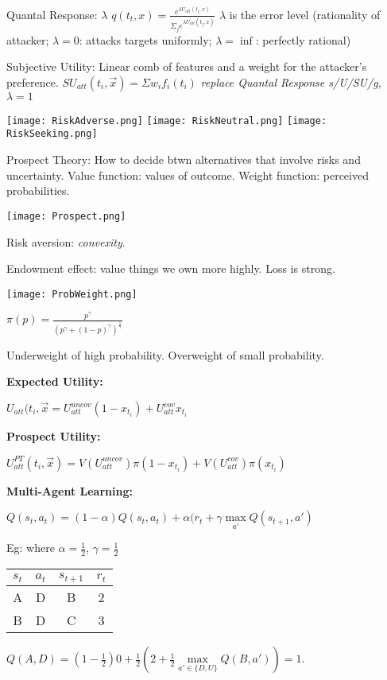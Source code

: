\documentclass[12pt,letter]{article}
\begin{document}
\begin{multicols}{2}
Quantal Response: $\lambda$
$q(t_t,x) = \frac{e^{\lambda U_{att}(t_i,x)}}{\Sigma_j e^{\lambda U_{att}(t_j,x)}}$
$\lambda$ is the error level (rationality of attacker; $\lambda=0$: attacks
targets uniformly; $\lambda=\inf$: perfectly rational)

Subjective Utility: Linear comb of features and a weight for the attacker's
preference. $SU_{att}(t_i,\vec{x}) = \Sigma w_if_i(t_i)$ \textit{replace Quantal
Response s/U/SU/g, $\lambda=1$}

\texttt{[image: RiskAdverse.png]}
\texttt{[image: RiskNeutral.png]}
\texttt{[image: RiskSeeking.png]}

Prospect Theory: How to decide btwn alternatives that involve risks and uncertainty.
Value function: values of outcome. Weight function: perceived probabilities.

\texttt{[image: Prospect.png]}

Risk aversion: \textit{convexity}. 

Endowment effect: value things we own more highly. Loss is strong.

\texttt{[image: ProbWeight.png]}

$\pi(p) = \frac{p^\gamma}{(p^\gamma + (1-p)^\gamma)^\frac{1}{\gamma}}$

Underweight of high probability. Overweight of small probability.

\textbf{Expected Utility:}

$U_{att}(t_i,\vec{x} = U_{att}^{uncov} (1-x_{t_i}) + U_{att}^{cov} x_{t_i}$

\textbf{Prospect Utility:}

$U_{att}^{PT} (t_i,\vec{x}) = V(U_{att}^{uncov}) \pi(1-x_{t_i}) + V(U_{att}^{cov}) \pi(x_{t_i})$

\textbf{Multi-Agent Learning:}

$Q(s_t,a_t) = (1-\alpha)Q(s_t,a_t) + \alpha(r_t + \gamma\max\limits_{a'}Q(s_{t+1},a')$

Eg: where $\alpha=\frac12$, $\gamma=\frac12$

\begin{tabular}{|c|c|c|c|}
    \hline
    $s_t$ & $a_t$ & $s_{t+1}$ & $r_t$ \\\hline
    A & D & B & 2\\\hline
    B & D & C & 3\\\hline
\end{tabular}

$Q(A,D) = (1-\frac12)0 + \frac12(2 + \frac12\max\limits_{a'\in\{D,U\}}Q(B,a'))=1.$


\end{multicols}
\end{document}
